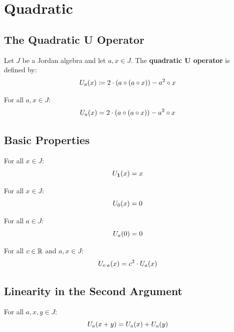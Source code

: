 \section{Quadratic}

\subsection{The Quadratic U Operator}

\begin{definition}[U]
Let $J$ be a Jordan algebra and let $a, x \in J$. The \textbf{quadratic U operator} is defined by:
\[ U_{a}(x) \coloneqq 2 \cdot (a \circ (a \circ x)) - a^{2} \circ x \]
\end{definition}

\begin{theorem}[U\_def]
For all $a, x \in J$:
\[ U_{a}(x) = 2 \cdot (a \circ (a \circ x)) - a^{2} \circ x \]
\end{theorem}

\subsection{Basic Properties}

\begin{theorem}[U\_one]
For all $x \in J$:
\[ U_{\mathbf{1}}(x) = x \]
\end{theorem}

\begin{theorem}
For all $x \in J$:
\[ U_{0}(x) = 0 \]
\end{theorem}

\begin{theorem}
For all $a \in J$:
\[ U_{a}(0) = 0 \]
\end{theorem}

\begin{theorem}[U\_smul]
For all $c \in \mathbb{R}$ and $a, x \in J$:
\[ U_{c \cdot a}(x) = c^2 \cdot U_{a}(x) \]
\end{theorem}

\subsection{Linearity in the Second Argument}

\begin{theorem}
For all $a, x, y \in J$:
\[ U_{a}(x + y) = U_{a}(x) + U_{a}(y) \]
\end{theorem}

